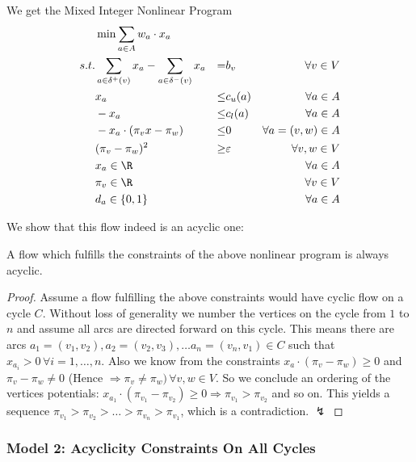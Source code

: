We get the Mixed Integer Nonlinear Program
\begin{align*}
  &\min \sum_{a\in A} w_a\cdot x_a & \\
 s.t. & \sum_{a\in \delta^+(v)}x_a - \sum_{a\in\delta^- (v)}x_a &=& b_v\ &\forall v\in V \\
 & x_a &\le& c_u(a) & \forall a\in A\\
 & -x_a &\le& c_l(a) & \forall a\in A\\
 & -x_a\cdot (\pi_vx -\pi_w)&\le& 0 &\forall a=(v,w)\in A\\
 & (\pi_v - \pi_w)^2 &\ge& \varepsilon &\forall v,w \in V\\
 & x_a \in \R & & &\forall a\in A\\
 & \pi_v \in \R & & & \forall v\in V\\
 & d_a \in \{0,1\} & & &\forall a\in A\\
\end{align*}

We show that this flow indeed is an acyclic one:

\begin{prop}
 A flow which fulfills the constraints of the above nonlinear program is always acyclic.
\end{prop}
\begin{proof}
 Assume a flow fulfilling the above constraints would have cyclic flow on a cycle $C$. Without loss of generality 
we number the vertices on the cycle from $1$ to $n$ and assume all arcs are directed forward on this cycle. This means 
there are arcs $a_1=(v_1,v_2),a_2=(v_2,v_3), \dots a_n=(v_n, v_1)\in C$ such that $x_{a_i} > 0 \,\forall i={1,\dots , 
n}$. Also we know from the constraints  $x_a\cdot (\pi_v -\pi_w)\ge 0$ and $\pi_v - \pi_w \neq 0$ (Hence $\Rightarrow 
\pi_v\neq\pi_w)\, \forall v,w\in V$. So we conclude an ordering of the vertices potentials: $x_{a_1}\cdot (\pi_{v_1} 
-\pi_{v_2})\ge 0 \Rightarrow \pi_{v_1}>\pi_{v_2}$ and so on. This yields a sequence $\pi_{v_1}>\pi_{v_2}>\dots 
>\pi_{v_n}>\pi_{v_1}$, which is a contradiction. $\lightning$
\end{proof}

\subsubsection{Model 2: Acyclicity Constraints On All Cycles}

